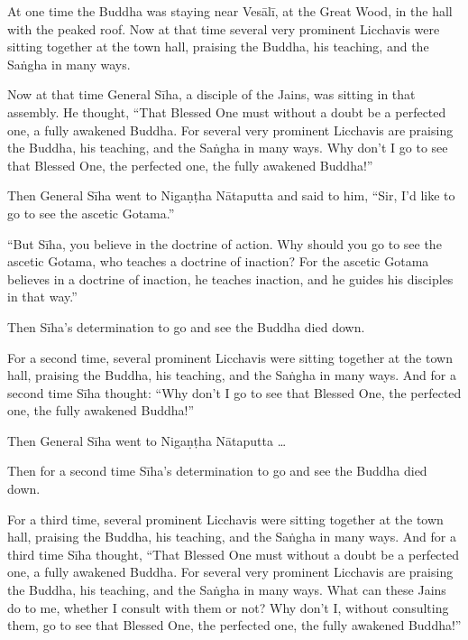 \documentclass[12pt,openany]{book}%
\begin{document}
At one time the Buddha was staying near \textsanskrit{Vesālī}, at the Great Wood, in the hall with the peaked roof. Now at that time several very prominent Licchavis were sitting together at the town hall, praising the Buddha, his teaching, and the \textsanskrit{Saṅgha} in many ways. 

Now at that time General \textsanskrit{Sīha}, a disciple of the Jains, was sitting in that assembly. He thought, “That Blessed One must without a doubt be a perfected one, a fully awakened Buddha. For several very prominent Licchavis are praising the Buddha, his teaching, and the \textsanskrit{Saṅgha} in many ways. Why don’t I go to see that Blessed One, the perfected one, the fully awakened Buddha!” 

Then General \textsanskrit{Sīha} went to \textsanskrit{Nigaṇṭha} \textsanskrit{Nātaputta} and said to him, “Sir, I’d like to go to see the ascetic Gotama.” 

“But \textsanskrit{Sīha}, you believe in the doctrine of action. Why should you go to see the ascetic Gotama, who teaches a doctrine of inaction? For the ascetic Gotama believes in a doctrine of inaction, he teaches inaction, and he guides his disciples in that way.” 

Then \textsanskrit{Sīha}’s determination to go and see the Buddha died down. 

For a second time, several prominent Licchavis were sitting together at the town hall, praising the Buddha, his teaching, and the \textsanskrit{Saṅgha} in many ways. And for a second time \textsanskrit{Sīha} thought: “Why don’t I go to see that Blessed One, the perfected one, the fully awakened Buddha!” 

Then General \textsanskrit{Sīha} went to \textsanskrit{Nigaṇṭha} \textsanskrit{Nātaputta} … 

Then for a second time \textsanskrit{Sīha}’s determination to go and see the Buddha died down. 

For a third time, several prominent Licchavis were sitting together at the town hall, praising the Buddha, his teaching, and the \textsanskrit{Saṅgha} in many ways. And for a third time \textsanskrit{Sīha} thought, “That Blessed One must without a doubt be a perfected one, a fully awakened Buddha. For several very prominent Licchavis are praising the Buddha, his teaching, and the \textsanskrit{Saṅgha} in many ways. What can these Jains do to me, whether I consult with them or not? Why don’t I, without consulting them, go to see that Blessed One, the perfected one, the fully awakened Buddha!” 
\end{document}
